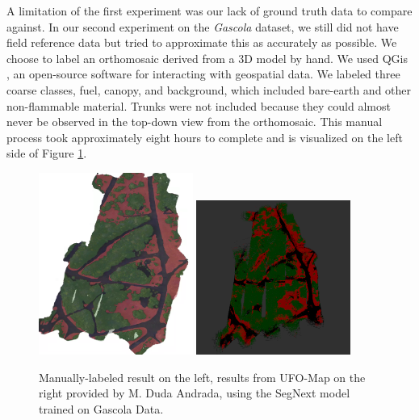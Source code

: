 A limitation of the first experiment was our lack of ground truth data to compare against.
In our second experiment on the \textit{Gascola} dataset, we still did not have field reference data but tried to approximate this as accurately as possible.
We choose to label an orthomosaic derived from a 3D model by hand. We used QGis \cite{QGIS_software}, an open-source software for interacting with geospatial data. We labeled three coarse classes, fuel, canopy, and background, which included bare-earth and other non-flammable material. Trunks were not included because they could almost never be observed in the top-down view from the orthomosaic. This manual process took approximately eight hours to complete and is visualized on the left side of Figure \ref{fig:results:semantic_map_UFO}.

\begin{figure}[H]
    \centering
    \includegraphics[width=0.45\textwidth]{figs/results/semantic_mapping/labeled_orthomoasaic.png}
    \includegraphics[width=0.45\textwidth]{figs/results/semantic_mapping/segnext_gc5_ufomap.png}
    \caption{Manually-labeled result on the left, results from UFO-Map on the right provided by M. Duda Andrada, using the SegNext model trained on Gascola Data.}
    \label{fig:results:semantic_map_UFO}
\end{figure}

